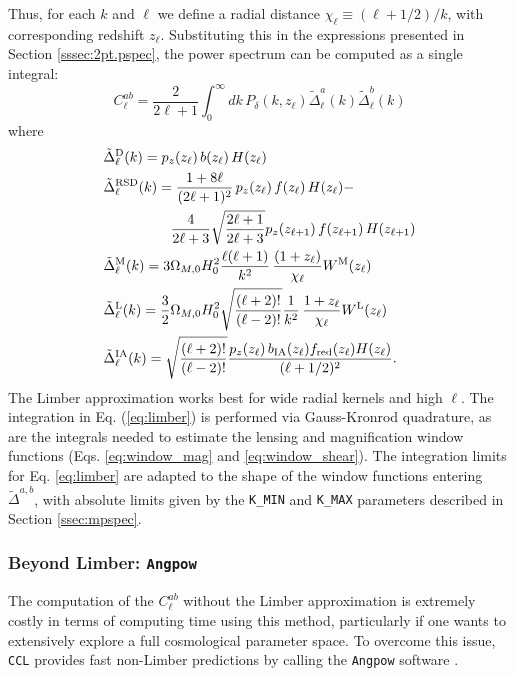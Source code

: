 \documentclass[\docopts]{\docclass}
\newcommand{\ccl}{{\tt CCL}\xspace}
\begin{document}
Thus, for each $k$ and $\ell$ we define a radial distance $\chi_\ell\equiv(\ell+1/2)/k$, with corresponding redshift $z_\ell$. Substituting this in the expressions presented in Section \ref{sssec:2pt.pspec}, the power spectrum can be computed as a single integral:
\begin{equation}\label{eq:limber}
 C^{ab}_\ell=\frac{2}{2\ell+1}\int_0^\infty dk\,P_\delta\left(k,z_\ell\right)
 \tilde{\Delta}^a_\ell(k)\tilde{\Delta}^b_\ell(k)
\end{equation}
where
\begin{align}
 &\tilde{\Delta}_\ell^{\rm D}(k)=p_z(z_\ell)\,b(z_\ell)\,H(z_\ell)\\
 &\tilde{\Delta}_\ell^{\rm RSD}(k)=
 \frac{1+8\ell}{(2\ell+1)^2}\,p_z(z_\ell)\,f(z_\ell)\,H(z_\ell)-\\\nonumber
 &\hspace{48pt}\frac{4}{2\ell+3}\sqrt{\frac{2\ell+1}{2\ell+3}}p_z(z_{\ell+1})\,f(z_{\ell+1})\,H(z_{\ell+1})\\
 &\tilde{\Delta}_\ell^{\rm M}(k)=3\Omega_{M,0}H_0^2\frac{\ell(\ell+1)}{k^2}\,
 \frac{(1+z_\ell)}{\chi_\ell}W^{\rm M}(z_\ell)\\
 &\tilde{\Delta}_\ell^{\rm L}(k)=\frac{3}{2}\Omega_{M,0}H_0^2\sqrt{\frac{(\ell+2)!}{(\ell-2)!}}\frac{1}{k^2}\,
 \frac{1+z_\ell}{\chi_\ell}W^{\rm L}(z_\ell)\\
 &\tilde{\Delta}_\ell^{\rm IA}(k)=\sqrt{\frac{(\ell+2)!}{(\ell-2)!}}\frac{p_z(z_\ell)\,b_{\rm IA}(z_\ell)f_{\rm red}(z_\ell)H(z_\ell)}{(\ell+1/2)^2}.
\end{align}
The Limber approximation works best for wide radial kernels and high $\ell$. The integration in Eq. (\ref{eq:limber}) is performed via Gauss-Kronrod quadrature, as are the integrals needed to estimate the lensing and magnification window functions (Eqs. \ref{eq:window_mag} and \ref{eq:window_shear}). The integration limits for Eq. \ref{eq:limber} are adapted to the shape of the window functions entering $\tilde{\Delta}^{a,b}$, with absolute limits given by the {\tt K\_MIN} and {\tt K\_MAX} parameters described in Section \ref{ssec:mpspec}. 

\subsubsection{Beyond Limber: \texttt{Angpow}}
\label{sec:angpow}

The computation of the $C^{ab}_\ell$ without the Limber approximation is extremely costly in terms of computing time using this method, particularly if one wants to extensively explore a full cosmological parameter space. To overcome this issue, \ccl provides fast non-Limber predictions by calling the \texttt{Angpow} software \citep{2017A&A...602A..72C}. 
\end{document}
